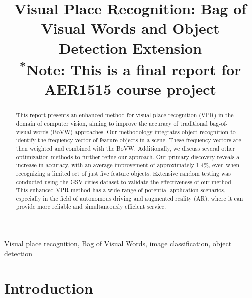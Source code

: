 \documentclass[conference]{IEEEtran}
\begin{document}
\title{Visual Place Recognition: Bag of Visual Words and Object Detection Extension\\
{\footnotesize \textsuperscript{*}Note: This is a final report for AER1515 course project}
}

\author{
\and
{}
}

\maketitle

\begin{abstract}
This report presents an enhanced method for visual place recognition (VPR) in the domain of computer vision, aiming to improve the accuracy of traditional bag-of-visual-words (BoVW) approaches. Our methodology integrates object recognition to identify the frequency vector of feature objects in a scene. These frequency vectors are then weighted and combined with the BoVW. Additionally, we discuss several other optimization methods to further refine our approach. Our primary discovery reveals a increase in accuracy, with an average improvement of approximately 1.4\%, even when recognizing a limited set of just five feature objects. Extensive random testing was conducted using the GSV-cities dataset\cite{ali2022gsv} to validate the effectiveness of our method. This enhanced VPR method has a wide range of potential application scenarios, especially in the field of autonomous driving and augmented reality (AR), where it can provide more reliable and simultaneously efficient service.
\end{abstract}

\begin{IEEEkeywords}
Visual place recognition, Bag of Visual Words, image classification, object detection
\end{IEEEkeywords}

\section{Introduction}
\end{document}
